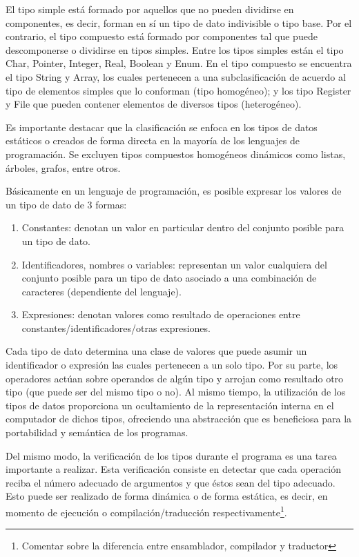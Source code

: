 El tipo simple está formado por aquellos que no pueden dividirse en componentes, es decir, forman en sí un tipo de dato indivisible o tipo base. Por el contrario, el tipo compuesto está formado por componentes tal que puede descomponerse o dividirse en tipos simples. Entre los tipos simples están el tipo Char, Pointer, Integer, Real, Boolean y Enum. En el tipo compuesto se encuentra el tipo String y Array, los cuales pertenecen a una subclasificación de acuerdo al tipo de elementos simples que lo conforman (tipo homogéneo); y los tipo Register y File que pueden contener elementos de diversos tipos (heterogéneo).

Es importante destacar que la clasificación se enfoca en los tipos de datos estáticos o creados de forma directa en la mayoría de los lenguajes de programación. Se excluyen tipos compuestos homogéneos dinámicos como listas, árboles, grafos, entre otros.

Básicamente en un lenguaje de programación, es posible expresar los valores de un tipo de dato de 3 formas:
\begin{enumerate}
\item Constantes: denotan un valor en particular dentro del conjunto posible para un tipo de dato.
\item Identificadores, nombres o variables: representan un valor cualquiera del conjunto posible para un tipo de dato asociado a una combinación de caracteres (dependiente del lenguaje).
\item Expresiones: denotan valores como resultado de operaciones entre constantes/identificadores/otras expresiones.
\end{enumerate}

Cada tipo de dato determina una clase de valores que puede asumir un identificador o expresión las cuales pertenecen a un solo tipo. Por su parte, los operadores actúan sobre operandos de algún tipo y arrojan como resultado otro tipo (que puede ser del mismo tipo o no). Al mismo tiempo, la utilización de los tipos de datos proporciona un ocultamiento de la representación interna en el computador de dichos tipos, ofreciendo una abstracción que es beneficiosa para la portabilidad y semántica de los programas.

Del mismo modo, la verificación de los tipos durante el programa es una tarea importante a realizar. Esta verificación consiste en detectar que cada operación reciba el número adecuado de argumentos y que éstos sean del tipo adecuado. Esto puede ser realizado de forma dinámica o de forma estática, es decir, en momento de ejecución o compilación/traducción respectivamente\footnote{Comentar sobre la diferencia entre ensamblador, compilador y traductor}.

